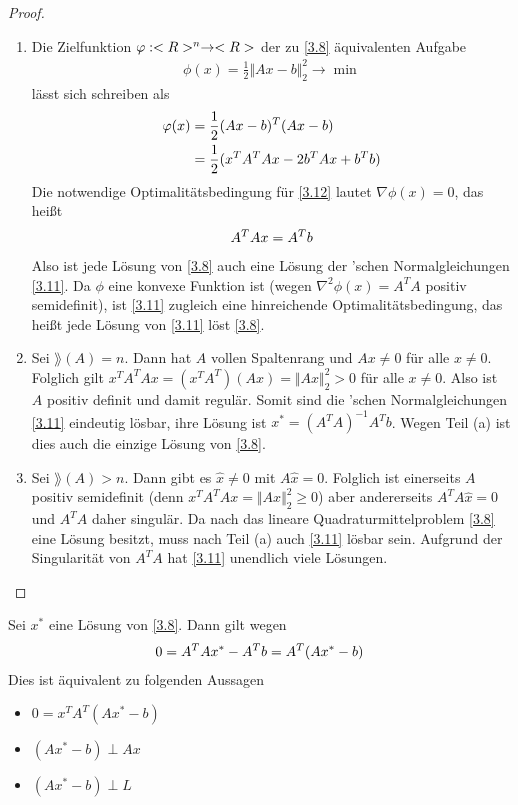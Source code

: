 \begin{proof}
	\begin{enumerate}[label=(\alph*)]
		\item Die Zielfunktion $\phi:\real^n\to\real$ der zu \cref{3.8} äquivalenten Aufgabe
		\begin{align}
			\label{3.12}
			\phi(x) = \frac{1}{2}\Vert Ax-b\Vert_2^2\to\min
		\end{align}
		lässt sich schreiben als
		\begin{align}
			\phi(x) &= \frac{1}{2}(Ax-b)^T(Ax-b) \notag \\
			&= \frac{1}{2} (x^TA^TAx - 2b^TAx+b^Tb)\notag
		\end{align}
		Die notwendige Optimalitätsbedingung für \cref{3.12} lautet $\nabla\phi(x)=0$, das heißt
		\begin{align}
			A^TAx = A^Tb\notag
		\end{align}
		Also ist jede Lösung von \cref{3.8} auch eine Lösung der 'schen Normalgleichungen \cref{3.11}. Da $\phi$ eine konvexe Funktion ist (wegen $\nabla^2\phi(x)=A^TA$ positiv semidefinit), ist \cref{3.11} zugleich eine hinreichende Optimalitätsbedingung, das heißt jede Lösung von \cref{3.11} löst \cref{3.8}.
		\item Sei $\rang(A)=n$. Dann hat $A$ vollen Spaltenrang und $Ax\neq 0$ für alle $x\neq 0$. Folglich gilt $x^TA^TAx=(x^TA^T)(Ax)=\Vert Ax\Vert_2^2>0$ für alle $x\neq 0$. Also ist $A$ positiv definit und damit regulär. Somit sind die 'schen Normalgleichungen \cref{3.11} eindeutig lösbar, ihre Lösung ist $x^*=(A^TA)^{-1}A^Tb$. Wegen Teil (a) ist dies auch die einzige Lösung von \cref{3.8}.
		\item Sei $\rang(A)>n$. Dann gibt es $\hat{x}\neq 0$ mit $A\hat{x}=0$. Folglich ist einerseits $A$ positiv semidefinit (denn $x^TA^TAx=\Vert Ax\Vert_2^2\ge 0$) aber andererseits $A^TA\hat{x}=0$ und $A^TA$ daher singulär. Da nach  das lineare Quadraturmittelproblem \cref{3.8} eine Lösung besitzt, muss nach Teil (a) auch \cref{3.11} lösbar sein. Aufgrund der Singularität von $A^TA$ hat \cref{3.11} unendlich viele Lösungen.
	\end{enumerate}
\end{proof}

Sei $x^*$ eine Lösung von \cref{3.8}. Dann gilt wegen  
\begin{align}
	0 = A^TAx^* - A^Tb = A^T(Ax^*-b)\notag
\end{align}
Dies ist äquivalent zu folgenden Aussagen
\begin{itemize}
	\item $0=x^TA^T(Ax^*-b)$
	\item $(Ax^*-b)\perp Ax$
	\item $(Ax^*-b)\perp L$
\end{itemize}


